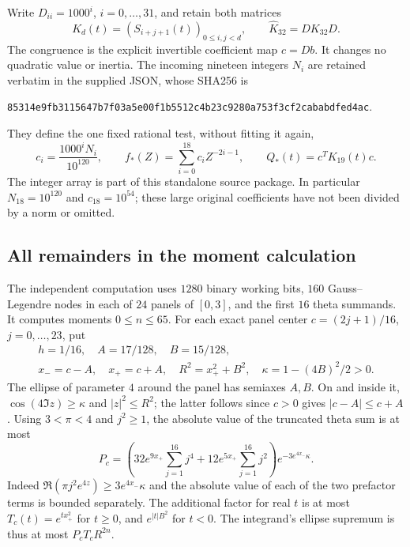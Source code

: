 Write $D_{ii}=1000^i$, $i=0,\ldots,31$, and retain both matrices
\begin{equation}\tag{RWR3}
 K_d(t)=(S_{i+j+1}(t))_{0\le i,j<d},\qquad
 \widehat K_{32}=D K_{32}D.
\end{equation}
The congruence is the explicit invertible coefficient map $c=Db$.
It changes no quadratic value or inertia. The incoming nineteen integers
$N_i$ are retained verbatim in the supplied JSON, whose SHA256 is
\begin{center}\small\ttfamily
\nolinkurl{85314e9fb3115647b7f03a5e00f1b5512c4b23c9280a753f3cf2cababdfed4ac}.
\end{center}
They define the one fixed rational test, without fitting it again,
\begin{equation}\tag{RWR4}
 c_i=\frac{1000^iN_i}{10^{120}},\qquad
 f_*(Z)=\sum_{i=0}^{18}c_iZ^{-2i-1},\qquad
 Q_*(t)=c^T K_{19}(t)c.
\end{equation}
The integer array is part of this standalone source package. In
particular $N_{18}=10^{120}$ and $c_{18}=10^{54}$; these large original
coefficients have not been divided by a norm or omitted.

\subsection{All remainders in the moment calculation}
The independent computation uses $1280$ binary working bits, $160$
Gauss--Legendre nodes in each of $24$ panels of $[0,3]$, and the first
$16$ theta summands. It computes moments $0\le n\le65$.
For each exact panel center $c=(2j+1)/16$, $j=0,\ldots,23$, put
\[
 \begin{gathered}h=1/16,\quad A=17/128,\quad B=15/128,\\
 x_-=c-A,\quad x_+=c+A,\quad R^2=x_+^2+B^2,
 \quad\kappa=1-(4B)^2/2>0.\end{gathered}
\]
The ellipse of parameter $4$ around the panel has semiaxes $A,B$.
On and inside it, $\cos(4\Im z)\ge\kappa$ and $|z|^2\le R^2$;
the latter follows since $c>0$ gives $|c-A|\le c+A$.
Using $3<\pi<4$ and $j^2\ge1$, the absolute value of the truncated
theta sum is at most
\begin{equation}\tag{RWR5}
 P_c=\left(32e^{9x_+}\sum_{j=1}^{16}j^4+
              12e^{5x_+}\sum_{j=1}^{16}j^2\right)
             e^{-3e^{4x_-}\kappa}.
\end{equation}
Indeed $\Re(\pi j^2e^{4z})\ge3e^{4x_-}\kappa$ and the
absolute value of each of the two prefactor terms is bounded separately.
The additional factor for real $t$ is at most
$T_c(t)=e^{t x_+^2}$ for $t\ge0$, and $e^{|t|B^2}$ for $t<0$.
The integrand's ellipse supremum is thus at most $P_cT_c R^{2n}$.

